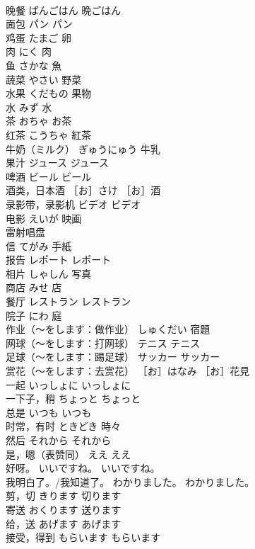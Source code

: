 \documentclass[8pt]{extreport}
\begin{document}
\begin{CJK}{UTF8}{min}
\\	晚餐	ばんごはん	晩ごはん
\\	面包	パン	パン
\\	鸡蛋	たまご	卵
\\	肉	にく	肉
\\	鱼	さかな	魚
\\	蔬菜	やさい	野菜
\\	水果	くだもの	果物
\\	水	みず	水
\\	茶	おちゃ	お茶
\\	红茶	こうちゃ	紅茶
\\	牛奶（ミルク）	ぎゅうにゅう	牛乳
\\	果汁	ジュース	ジュース
\\	啤酒	ビール	ビール
\\	酒类，日本酒	［お］さけ	［お］酒
\\	录影带，录影机	ビデオ	ビデオ
\\	电影	えいが	映画
\\	雷射唱盘	
\\	信	てがみ	手紙
\\	报告	レポート	レポート
\\	相片	しゃしん	写真
\\	商店	みせ	店
\\	餐厅	レストラン	レストラン
\\	院子	にわ	庭
\\	作业（～をします：做作业）	しゅくだい	宿題
\\	网球（～をします：打网球）	テニス	テニス
\\	足球（～をします：踢足球）	サッカー	サッカー
\\	赏花（～をします：去赏花）	［お］はなみ	［お］花見
\\	一起	いっしょに	いっしょに
\\	一下子，稍	ちょっと	ちょっと
\\	总是	いつも	いつも
\\	时常，有时	ときどき	時々
\\	然后	それから	それから
\\	是，嗯（表赞同）	ええ	ええ
\\	好呀。	いいですね。	いいですね。
\\	我明白了。/我知道了。	わかりました。	わかりました。
\\	剪，切	きります	切ります
\\	寄送	おくります	送ります
\\	给，送	あげます	あげます
\\	接受，得到	もらいます	もらいます

\end{CJK}
\end{document}
